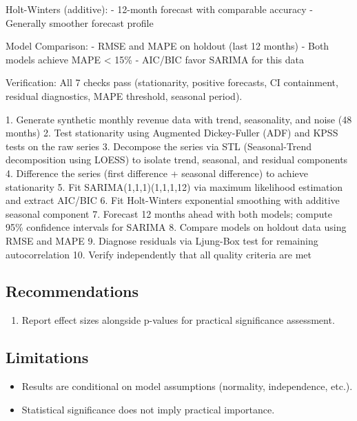 \documentclass[11pt, a4paper]{article}
\begin{document}
Holt-Winters (additive):
- 12-month forecast with comparable accuracy
- Generally smoother forecast profile

Model Comparison:
- RMSE and MAPE on holdout (last 12 months)
- Both models achieve MAPE < 15\%
- AIC/BIC favor SARIMA for this data

Verification: All 7 checks pass (stationarity, positive forecasts, CI containment, residual diagnostics, MAPE threshold, seasonal period).

1. Generate synthetic monthly revenue data with trend, seasonality, and noise (48 months)
2. Test stationarity using Augmented Dickey-Fuller (ADF) and KPSS tests on the raw series
3. Decompose the series via STL (Seasonal-Trend decomposition using LOESS) to isolate trend, seasonal, and residual components
4. Difference the series (first difference + seasonal difference) to achieve stationarity
5. Fit SARIMA(1,1,1)(1,1,1,12) via maximum likelihood estimation and extract AIC/BIC
6. Fit Holt-Winters exponential smoothing with additive seasonal component
7. Forecast 12 months ahead with both models; compute 95\% confidence intervals for SARIMA
8. Compare models on holdout data using RMSE and MAPE
9. Diagnose residuals via Ljung-Box test for remaining autocorrelation
10. Verify independently that all quality criteria are met



\subsection{Recommendations}

\begin{enumerate}
  \item Report effect sizes alongside p-values for practical significance assessment.
\end{enumerate}

\subsection{Limitations}

\begin{polyawarnbox}
\begin{itemize}
  \item Results are conditional on model assumptions (normality, independence, etc.).
  \item Statistical significance does not imply practical importance.
\end{itemize}
\end{polyawarnbox}

\end{document}
